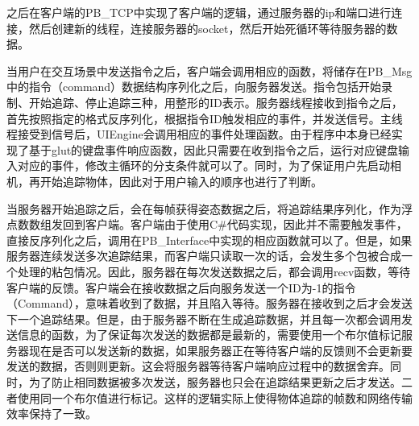 之后在客户端的PB\_TCP中实现了客户端的逻辑，通过服务器的ip和端口进行连接，然后创建新的线程，连接服务器的socket，然后开始死循环等待服务器的数据。

当用户在交互场景中发送指令之后，客户端会调用相应的函数，将储存在PB\_Msg中的指令（command）数据结构序列化之后，向服务器发送。指令包括开始录制、开始追踪、停止追踪三种，用整形的ID表示。服务器线程接收到指令之后，首先按照指定的格式反序列化，根据指令ID触发相应的事件，并发送信号。主线程接受到信号后，UIEngine会调用相应的事件处理函数。由于程序中本身已经实现了基于glut的键盘事件响应函数，因此只需要在收到指令之后，运行对应键盘输入对应的事件，修改主循环的分支条件就可以了。同时，为了保证用户先启动相机，再开始追踪物体，因此对于用户输入的顺序也进行了判断。

当服务器开始追踪之后，会在每帧获得姿态数据之后，将追踪结果序列化，作为浮点数数组发回到客户端。客户端由于使用C\#代码实现，因此并不需要触发事件，直接反序列化之后，调用在PB\_Interface中实现的相应函数就可以了。但是，如果服务器连续发送多次追踪结果，而客户端只读取一次的话，会发生多个包被合成一个处理的粘包情况。因此，服务器在每次发送数据之后，都会调用recv函数，等待客户端的反馈。客户端会在接收数据之后向服务发送一个ID为-1的指令（Command），意味着收到了数据，并且陷入等待。服务器在接收到之后才会发送下一个追踪结果。但是，由于服务器不断在生成追踪数据，并且每一次都会调用发送信息的函数，为了保证每次发送的数据都是最新的，需要使用一个布尔值标记服务器现在是否可以发送新的数据，如果服务器正在等待客户端的反馈则不会更新要发送的数据，否则则更新。这会将服务器等待客户端响应过程中的数据舍弃。同时，为了防止相同数据被多次发送，服务器也只会在追踪结果更新之后才发送。二者使用同一个布尔值进行标记。这样的逻辑实际上使得物体追踪的帧数和网络传输效率保持了一致。

